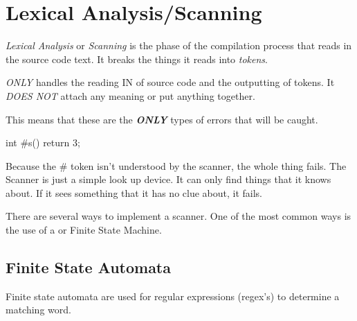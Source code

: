\section{Lexical Analysis/Scanning}\label{sec:Lexical Analysis}
\begin{definition}\label{def:Lexical Analysis}
  \emph{Lexical Analysis} or \emph{Scanning} is the phase of the compilation process that reads in the source code text.
  It breaks the things it reads into \emph{tokens}.
  \begin{remark}
     \emph{ONLY} handles the reading IN of source code and the outputting of tokens.
    It \emph{DOES NOT} attach any meaning or put anything together.
  \end{remark}

  This means that these are the \textbf{\emph{ONLY}} types of errors that will be caught.
  \begin{javasource}
    int #s() {
      return 3;
    }
  \end{javasource}

  Because the \# token isn't understood by the scanner, the whole thing fails.
  The Scanner is just a simple look up device. It can only find things that it knows about.
  If it sees something that it has no clue about, it fails.
\end{definition}

There are several ways to implement a scanner.
One of the most common ways is the use of a  or Finite State Machine.

\subsection{Finite State Automata}\label{subsec:Finite State Automata}
Finite state automata are used for regular expressions (regex's) to determine a matching word.

